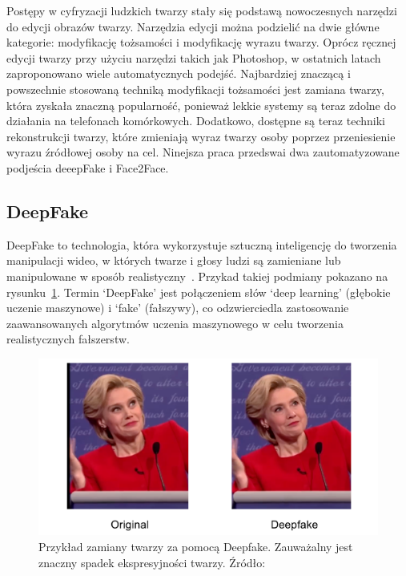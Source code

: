 Postępy w cyfryzacji ludzkich twarzy stały się podstawą nowoczesnych narzędzi do edycji obrazów twarzy. Narzędzia edycji można podzielić na dwie główne kategorie: modyfikację tożsamości i modyfikację wyrazu twarzy. Oprócz ręcznej edycji twarzy przy użyciu narzędzi takich jak Photoshop, w ostatnich latach zaproponowano wiele automatycznych podejść. Najbardziej znaczącą i powszechnie stosowaną techniką modyfikacji tożsamości jest zamiana twarzy, która zyskała znaczną popularność, ponieważ lekkie systemy są teraz zdolne do działania na telefonach komórkowych. Dodatkowo, dostępne są teraz techniki rekonstrukcji twarzy, które zmieniają wyraz twarzy osoby poprzez przeniesienie wyrazu źródłowej osoby na cel. Ninejsza praca przedswai dwa zautomatyzowane podjeścia deeepFake i Face2Face.

\subsection{DeepFake}
DeepFake to technologia, która wykorzystuje sztuczną inteligencję do tworzenia manipulacji wideo, w których twarze i głosy ludzi są zamieniane lub manipulowane w sposób realistyczny~\cite{DeepFakegithub}.
Przykad takiej podmiany pokazano na rysunku~\ref{img:deepfake-example}.
Termin `DeepFake' jest połączeniem słów `deep learning' (głębokie uczenie maszynowe) i `fake' (fałszywy), co odzwierciedla zastosowanie zaawansowanych algorytmów uczenia maszynowego w celu tworzenia realistycznych fałszerstw.

\begin{figure}
    \includegraphics[width=\linewidth]{img/deepfake_example}
    \centering
    \caption{ Przykład zamiany twarzy za pomocą Deepfake. Zauważalny jest znaczny spadek ekspresyjności twarzy. Źródło:~\cite{mesoNet} }
    \label{img:deepfake-example}
\end{figure}

